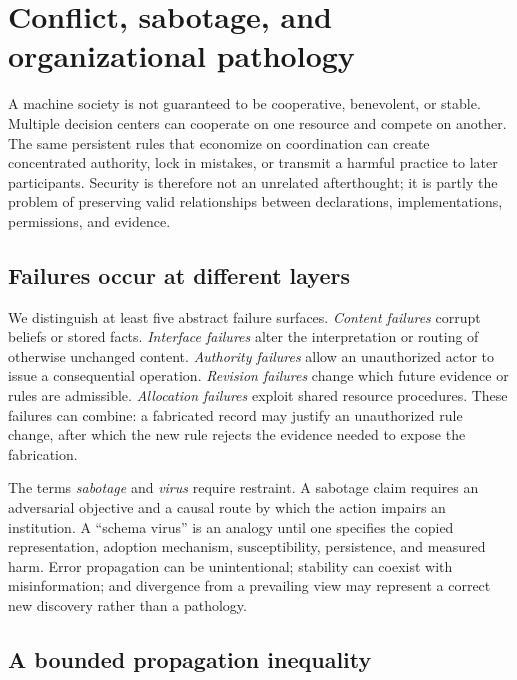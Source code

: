 \section{Conflict, sabotage, and organizational pathology}\label{MS:sec:security}

A machine society is not guaranteed to be cooperative, benevolent, or stable. Multiple decision centers can cooperate on one resource and compete on another. The same persistent rules that economize on coordination can create concentrated authority, lock in mistakes, or transmit a harmful practice to later participants. Security is therefore not an unrelated afterthought; it is partly the problem of preserving valid relationships between declarations, implementations, permissions, and evidence.

\subsection{Failures occur at different layers}

We distinguish at least five abstract failure surfaces. \emph{Content failures} corrupt beliefs or stored facts. \emph{Interface failures} alter the interpretation or routing of otherwise unchanged content. \emph{Authority failures} allow an unauthorized actor to issue a consequential operation. \emph{Revision failures} change which future evidence or rules are admissible. \emph{Allocation failures} exploit shared resource procedures. These failures can combine: a fabricated record may justify an unauthorized rule change, after which the new rule rejects the evidence needed to expose the fabrication.

The terms \emph{sabotage} and \emph{virus} require restraint. A sabotage claim requires an adversarial objective and a causal route by which the action impairs an institution. A ``schema virus'' is an analogy until one specifies the copied representation, adoption mechanism, susceptibility, persistence, and measured harm. Error propagation can be unintentional; stability can coexist with misinformation; and divergence from a prevailing view may represent a correct new discovery rather than a pathology.

\subsection{A bounded propagation inequality}

